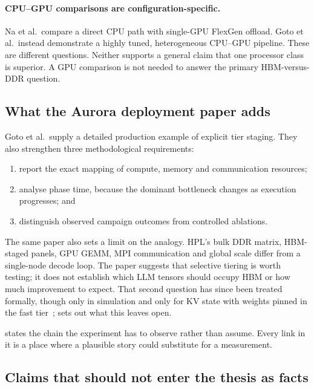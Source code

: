 \paragraph{CPU--GPU comparisons are configuration-specific.}
Na et al.\ compare a direct CPU path with single-GPU FlexGen offload.
Goto et al.\ instead demonstrate a highly tuned, heterogeneous CPU--GPU
pipeline.  These are different questions.  Neither supports a general
claim that one processor class is superior.  A GPU comparison is not
needed to answer the primary HBM-versus-DDR question.

\subsection{What the Aurora deployment paper adds}

Goto et al.\ supply a detailed production example of explicit tier
staging.  They also strengthen three methodological requirements:

\begin{enumerate}
  \item report the exact mapping of compute, memory and communication
        resources;
  \item analyse phase time, because the dominant bottleneck changes as
        execution progresses; and
  \item distinguish observed campaign outcomes from controlled
        ablations.
\end{enumerate}

The same paper also sets a limit on the analogy.  HPL's bulk DDR matrix,
HBM-staged panels, GPU GEMM, MPI communication and global scale differ
from a single-node \lcpp{} decode loop.  The paper suggests that
selective tiering is worth testing; it does not establish which LLM
tensors should occupy HBM or how much improvement to expect.  That
second question has since been treated formally, though only in
simulation and only for KV state with weights pinned in the fast
tier~\cite{fang2025kvplacement};  sets out
what this leaves open.

 states the chain the experiment has to
observe rather than assume.  Every link in it is a place where a
plausible story could substitute for a measurement.

\subsection{Claims that should not enter the thesis as facts}

